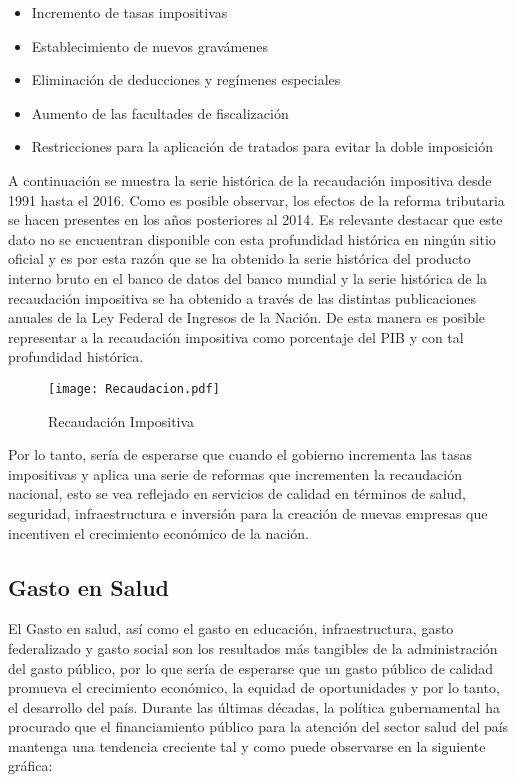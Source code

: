 \begin{itemize}
\item Incremento de tasas impositivas
\item Establecimiento de nuevos gravámenes
\item Eliminación de deducciones y regímenes especiales
\item Aumento de las facultades de fiscalización
\item Restricciones para la aplicación de tratados para evitar la doble imposición
\end{itemize}

A continuación se muestra la serie histórica de la recaudación impositiva desde 1991 hasta el 2016. Como es posible observar, los efectos de la reforma tributaria se hacen presentes en los años posteriores al 2014. Es relevante destacar que este dato no se encuentran disponible con esta profundidad histórica en ningún sitio oficial y es por esta razón que se ha obtenido la serie histórica del producto interno bruto en el banco de datos del banco mundial y la serie histórica de la recaudación impositiva se ha obtenido a través de las distintas publicaciones anuales de la Ley Federal de Ingresos de la Nación. De esta manera es posible representar a la recaudación impositiva como porcentaje del PIB y con tal profundidad histórica.

\begin{figure}[H]
\centering
\texttt{[image: Recaudacion.pdf]}
\caption{Recaudación Impositiva}
\label{Rec}
\end{figure}

Por lo tanto, sería de esperarse que cuando el gobierno incrementa las tasas impositivas y aplica una serie de reformas que incrementen la recaudación nacional, esto se vea reflejado en servicios de calidad en términos de salud, seguridad, infraestructura e inversión para la creación de nuevas empresas que incentiven el crecimiento económico de la nación.

\subsection{Gasto en Salud}


El Gasto en salud, así como el gasto en educación, infraestructura, gasto federalizado y gasto social son los resultados más tangibles de la administración del gasto público, por lo que sería de esperarse que un gasto público de calidad promueva el crecimiento económico, la equidad de oportunidades y por lo tanto, el desarrollo del país. Durante las últimas décadas, la política gubernamental ha procurado que el financiamiento público para la atención del sector salud del país mantenga una tendencia creciente tal y como puede observarse en la siguiente gráfica:

